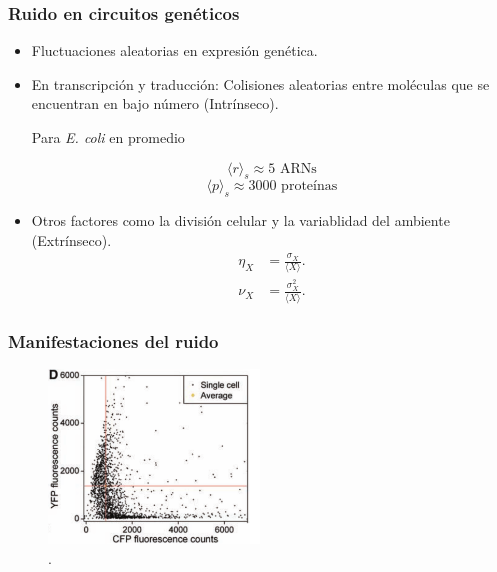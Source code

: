 \documentclass{beamer}
\begin{document}
\begin{frame}
\frametitle{Ruido en circuitos gen\'eticos}
\begin{itemize}
\item Fluctuaciones aleatorias en expresi\'on gen\'etica.
\item En transcripci\'on y traducci\'on: Colisiones aleatorias entre mol\'eculas que se encuentran en bajo n\'umero (Intr\'inseco).

Para \textit{E. coli} en promedio

$$\langle r\rangle_s \approx 5 \text{ ARNs}$$
$$\langle p\rangle_s \approx 3000 \text{ prote\'inas}$$

\item Otros factores como la divisi\'on celular y la variablidad del ambiente (Extr\'inseco).
\begin{align*}
\eta_X &= \frac{\sigma_X}{\langle X \rangle}.\\[1.5ex]
\nu_X &= \frac{\sigma^2_X}{\langle X \rangle}.
\end{align*}
\end{itemize}
\end{frame}

\begin{frame}
\frametitle{Manifestaciones del ruido}
\begin{figure}[p]
    \centering
    \includegraphics[width=0.5\textwidth]{noiseGFP.png}\\
    \tiny \cite{pedraza05}.
\end{figure}
\end{frame}
\end{document}
